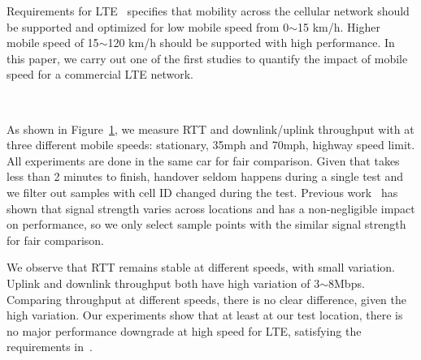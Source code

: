 
\label{sec:net.speed}

Requirements for LTE~\cite{tr25.913} specifies that mobility across the cellular network should be supported and optimized for low mobile speed from 0$\sim$15 km/h. Higher mobile speed of 15$\sim$120 km/h should be supported with high performance. In this paper, we carry out one of the first studies to quantify the impact of mobile speed for a commercial LTE network.

\begin{figure}[h]
\centering
{} \\
\label{fig:net.speed}
\end{figure}

As shown in Figure~\ref{fig:net.speed}, we measure RTT and downlink/uplink throughput with \mobiperf at three different mobile speeds: stationary, 35mph and 70mph, highway speed limit. All experiments are done in the same car for fair comparison. Given that \mobiperf takes less than 2 minutes to finish, handover seldom happens during a single test and we filter out samples with cell ID changed during the test. Previous work~\cite{mobicom.bartendr} has shown that signal strength varies across locations and has a non-negligible impact on performance, so we only select sample points with the similar signal strength for fair comparison.

We observe that RTT remains stable at different speeds, with small variation. Uplink and downlink throughput both have high variation of 3$\sim$8Mbps. Comparing throughput at different speeds, there is no clear difference, given the high variation. Our experiments show that at least at our test location, there is no major performance downgrade at high speed for LTE, satisfying the requirements in~\cite{tr25.913}.

